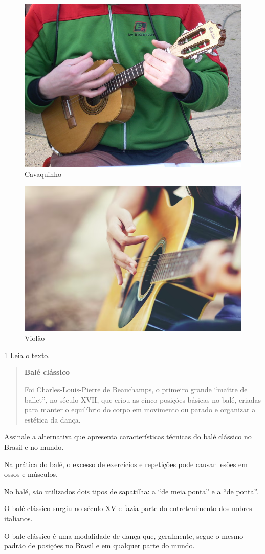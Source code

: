 \begin{figure}[htpb!]
\acima{( )}
\includegraphics[width=.5\textwidth]{./imgs/art19c.jpeg}
\caption{Cavaquinho}
\end{figure}
\begin{figure}[htpb!]
\includegraphics[width=.5\textwidth]{./imgs/art19d.png}
\caption{Violão}
\end{figure}


\num{1} Leia o texto.

\begin{quote}
\textbf{Balé clássico}

Foi Charles-Louis-Pierre de Beauchamps, o primeiro grande ``maître de ballet'', no século XVII, que criou as cinco posições básicas no balé, criadas para manter o equilíbrio do corpo em movimento ou parado e organizar a estética da dança.

\end{quote}

Assinale a alternativa que apresenta características técnicas do balé
clássico no Brasil e no mundo.

\begin{escolha}
\item
  Na prática do balé, o excesso de exercícios e repetições pode causar
  lesões em ossos e músculos.
\item
  No balé, são utilizados dois tipos de sapatilha: a “de meia ponta” e
  a “de ponta”.
\item
  O balé clássico surgiu no século XV e fazia parte do entretenimento
  dos nobres italianos.
\item
  O bale clássico é uma modalidade de dança que, geralmente, segue o
  mesmo padrão de posições no Brasil e em qualquer parte do mundo.
\end{escolha}

